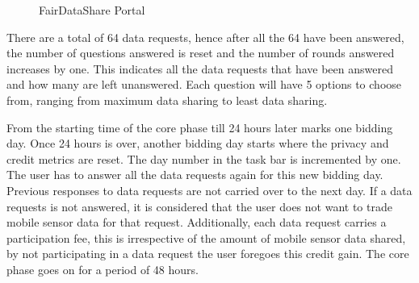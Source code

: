 \begin{figure}[htp]
  \hspace{1em}
  \caption{FairDataShare Portal}
  \label{fig:bid}
\end{figure}


There are a total of 64 data requests, hence after all the 64 have been answered, the number of questions answered is reset and the number of rounds answered increases by one. This indicates all the data requests that have been answered and how many are left unanswered. Each question will have 5 options to choose from, ranging from maximum data sharing to least data sharing.

From the starting time of the core phase till 24 hours later marks one bidding day. Once 24 hours is over, another bidding day starts where the privacy and credit metrics are reset. The day number in the task bar is incremented by one. The user has to answer all the data requests again for this new bidding day. Previous responses to data requests are not carried over to the next day. If a data requests is not answered, it is considered that the user does not want to trade mobile sensor data for that request. Additionally, each data request carries a participation fee, this is irrespective of the amount of mobile sensor data shared, by not participating in a data request the user foregoes this credit gain.
The core phase goes on for a period of 48 hours. 

